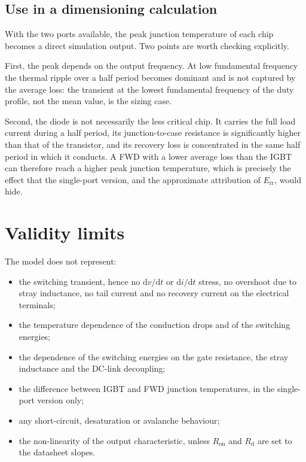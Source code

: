 \documentclass[11pt,a4paper]{article}
\begin{document}
\subsection{Use in a dimensioning calculation}

With the two ports available, the peak junction temperature of each chip
becomes a direct simulation output. Two points are worth checking explicitly.

First, the peak depends on the output frequency. At low fundamental frequency
the thermal ripple over a half period becomes dominant and is not captured by
the average loss: the transient at the lowest fundamental frequency of the duty
profile, not the mean value, is the sizing case.

Second, the diode is not necessarily the less critical chip. It carries the full
load current during a half period, its junction-to-case resistance is
significantly higher than that of the transistor, and its recovery loss is
concentrated in the same half period in which it conducts. A FWD with a lower
average loss than the IGBT can therefore reach a higher peak junction
temperature, which is precisely the effect that the single-port version, and the
approximate attribution of $E_\mathrm{rr}$, would hide.

\section{Validity limits}

The model does not represent:
\begin{itemize}
  \item the switching transient, hence no $\mathrm{d}v/\mathrm{d}t$ or
        $\mathrm{d}i/\mathrm{d}t$ stress, no overshoot due to stray inductance,
        no tail current and no recovery current on the electrical terminals;
  \item the temperature dependence of the conduction drops and of the switching
        energies;
  \item the dependence of the switching energies on the gate resistance, the
        stray inductance and the DC-link decoupling;
  \item the difference between IGBT and FWD junction temperatures, in the
        single-port version only;
  \item any short-circuit, desaturation or avalanche behaviour;
  \item the non-linearity of the output characteristic, unless $R_\mathrm{on}$
        and $R_\mathrm{d}$ are set to the datasheet slopes.
\end{itemize}
\end{document}
